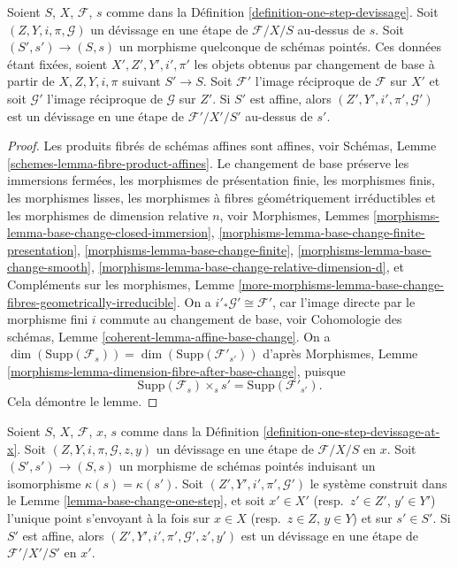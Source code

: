 \begin{lemma}
\label{lemma-base-change-one-step}
Soient $S$, $X$, $\mathcal{F}$, $s$ comme dans la
Définition \ref{definition-one-step-devissage}.
Soit $(Z, Y, i, \pi, \mathcal{G})$ un d\'evissage en une étape
de $\mathcal{F}/X/S$ au-dessus de $s$.
Soit $(S', s') \to (S, s)$ un morphisme quelconque de schémas pointés.\newline
Ces données étant fixées, soient $X', Z', Y', i', \pi'$ les objets obtenus par changement
de base à partir de $X, Z, Y, i, \pi$ suivant $S' \to S$.
Soit $\mathcal{F}'$ l'image réciproque de $\mathcal{F}$ sur $X'$
et soit $\mathcal{G}'$ l'image réciproque de $\mathcal{G}$ sur $Z'$.
Si $S'$ est affine, alors $(Z', Y', i', \pi', \mathcal{G}')$
est un d\'evissage en une étape de $\mathcal{F}'/X'/S'$ au-dessus de $s'$.
\end{lemma}

\begin{proof}
Les produits fibrés de schémas affines sont affines, voir
Schémas, Lemme \ref{schemes-lemma-fibre-product-affines}.
Le changement de base préserve
les immersions fermées,
les morphismes de présentation finie,
les morphismes finis,
les morphismes lisses,
les morphismes à fibres géométriquement irréductibles et
les morphismes de dimension relative $n$, voir
Morphismes, Lemmes \ref{morphisms-lemma-base-change-closed-immersion},
\ref{morphisms-lemma-base-change-finite-presentation},
\ref{morphisms-lemma-base-change-finite},
\ref{morphisms-lemma-base-change-smooth},
\ref{morphisms-lemma-base-change-relative-dimension-d}, et
Compléments sur les morphismes, Lemme
\ref{more-morphisms-lemma-base-change-fibres-geometrically-irreducible}.
On a $i'_*\mathcal{G}' \cong \mathcal{F}'$, car l'image directe
par le morphisme fini $i$ commute au changement de base, voir
Cohomologie des schémas, Lemme \ref{coherent-lemma-affine-base-change}.
On a
$\dim(\text{Supp}(\mathcal{F}_s)) = \dim(\text{Supp}(\mathcal{F}'_{s'}))$
d'après
Morphismes, Lemme \ref{morphisms-lemma-dimension-fibre-after-base-change},
puisque
$$
\text{Supp}(\mathcal{F}_s) \times_s s' = \text{Supp}(\mathcal{F}'_{s'}).
$$
Cela démontre le lemme.
\end{proof}

\begin{lemma}
\label{lemma-base-change-one-step-at-x}
Soient $S$, $X$, $\mathcal{F}$, $x$, $s$ comme dans la
Définition \ref{definition-one-step-devissage-at-x}.\newline
Soit $(Z, Y, i, \pi, \mathcal{G}, z, y)$ un d\'evissage en une étape
de $\mathcal{F}/X/S$ en $x$.
Soit $(S', s') \to (S, s)$ un morphisme de schémas pointés
induisant un isomorphisme $\kappa(s) = \kappa(s')$.
Soit $(Z', Y', i', \pi', \mathcal{G}')$ le système construit dans le
Lemme \ref{lemma-base-change-one-step},
et soit $x' \in X'$ (resp.\ $z' \in Z'$, $y' \in Y'$) l'unique
point s'envoyant à la fois sur $x \in X$ (resp.\ $z \in Z$, $y \in Y$)
et sur $s' \in S'$.
Si $S'$ est affine, alors $(Z', Y', i', \pi', \mathcal{G}', z', y')$
est un d\'evissage en une étape de $\mathcal{F}'/X'/S'$ en $x'$.
\end{lemma}

